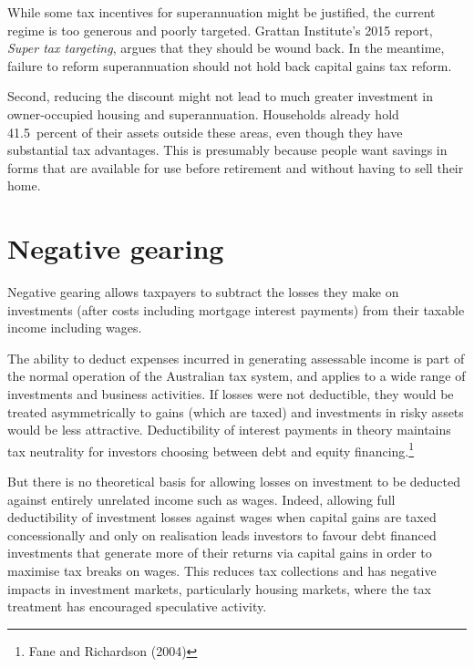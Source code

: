 \documentclass{grattan}\usepackage[]{graphicx}\usepackage[]{color}
\begin{document}
While some tax incentives for superannuation might be justified, the current regime is too generous and poorly targeted. Grattan Institute's 2015 report, \textit{Super tax targeting}, argues that they should be wound back.  In the meantime, failure to reform superannuation should not hold back capital gains tax reform. 



Second, reducing the discount might not lead to much greater investment in owner-occupied housing and superannuation. Households already hold 41.5~percent of their assets outside these areas, even though they have substantial tax advantages. This is presumably because people want savings in forms that are available for use before retirement and without having to sell their home.  






\chapter{Negative gearing}
Negative gearing allows taxpayers to subtract the losses they make on
investments (after costs including mortgage interest payments) from
their taxable income including wages.

The ability to deduct expenses incurred in generating assessable income
is part of the normal operation of the Australian tax system, and
applies to a wide range of investments and business activities. If
losses were not deductible, they would be treated asymmetrically to
gains (which are taxed) and investments in risky assets would be less
attractive. Deductibility of interest payments in theory maintains tax
neutrality for investors choosing between debt and equity
financing.\footnote{Fane and Richardson (2004)}

But there is no theoretical basis for allowing losses on investment to
be deducted against entirely unrelated income such as wages. Indeed,
allowing full deductibility of investment losses against wages when
capital gains are taxed concessionally and only on realisation leads
investors to favour debt financed investments that generate more of
their returns via capital gains in order to maximise tax breaks on
wages. This reduces tax collections and has negative impacts in
investment markets, particularly housing markets, where the tax
treatment has encouraged speculative activity.
\end{document}

